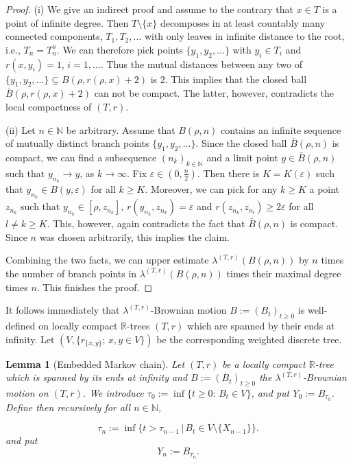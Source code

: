 \documentclass[11pt]{amsart}
\numberwithin{equation}{section}
\newtheorem{lemma}[definition]{Lemma}
\begin{document}
{\begin{proof}
(i) We give an indirect proof and assume to the contrary that $x\in T$ is a point of infinite degree. Then
$T\setminus\{x\}$ decomposes in at least countably many connected components, $T_1,T_2,...$ with only leaves in infinite distance to the root, i.e., $T_n=T_n^o$. We can therefore pick points $\{y_1,y_2,...\}$ with $y_i\in T_i$ and $r(x,y_i)=1$, $i=1,...$. Thus the mutual distances between any two of  $\{y_1,y_2,...\}\subseteq B(\rho,r(\rho,x)+2)$ is $2$. This implies that the closed ball $\bar{B}(\rho,r(\rho,x)+2)$ can not be compact. The latter, however, contradicts the local compactness of $(T,r)$.{\smallskip}

(ii) Let $n\in{{\mathbb N}}$ be arbitrary. Assume that $B(\rho,n)$ contains an infinite sequence of mutually distinct branch points $\{y_1,y_2,...\}$.
Since the closed ball $\bar{B}(\rho,n)$ is compact, we can find a subsequence $(n_k)_{k\in{{\mathbb N}}}$ and a limit point $y\in\bar{B}(\rho,n)$ such that $y_{n_k}\to y$, as $k\to\infty$.  Fix $\varepsilon\in(0,\frac{n}{2})$. Then there is $K=K(\varepsilon)$ such that $y_{n_k}\in B(y,\varepsilon)$ for all $k\ge K$. Moreover, we can pick for any $k\ge K$ a point $z_{n_k}$ such that $y_{n_k}\in[\rho,z_{n_k}]$, $r(y_{n_k},z_{n_k})=\varepsilon$ and $r(z_{n_k},z_{n_l})\ge 2\varepsilon$ for all $l\not =k\ge K$. This, however, again contradicts the fact that $\bar{B}(\rho,n)$ is compact. Since $n$ was chosen arbitrarily, this implies the claim.{\smallskip}

Combining the two facts, we can upper estimate $\lambda^{(T,r)}(B(\rho,n))$ by $n$ times the number of branch points in $\lambda^{(T,r)}(B(\rho,n))$
times their maximal degree times $n$. This finishes the proof.
\end{proof}{\smallskip}

It follows immediately that $\lambda^{(T,r)}$-Brownian motion $B:=(B_t)_{t\ge 0}$ is well-defined on locally compact ${{\mathbb R}}$-trees $(T,r)$
which are spanned by their ends at infinity. Let $(V,\{r_{\{x,y\}};\,x,y\in V\})$ be the corresponding weighted discrete tree.

\begin{lemma}[Embedded Markov chain]
Let $(T,r)$ be a locally compact ${{\mathbb R}}$-tree which is spanned by its ends at infinity and $B:=(B_t)_{t\ge 0}$ the
$\lambda^{(T,r)}$-Brownian motion on $(T,r)$. We introduce $\tau_0:=\inf\{t\ge 0:\,B_t\in V\}$, and put
$Y_0:=B_{\tau_0}$. Define then recursively for all $n\in{{\mathbb N}}$,\label{L:10}

\begin{equation}\label{e:f4}
   \tau_n
 :=
   \inf\big\{t>\tau_{n-1}\,|\,B_t\in V\setminus\{X_{n-1}\}\big\}.
\end{equation}
and put
\begin{equation}\label{e:f4Y}
   Y_n
 :=
   B_{\tau_n}.
\end{equation}


\end{lemma}}
\end{document}
